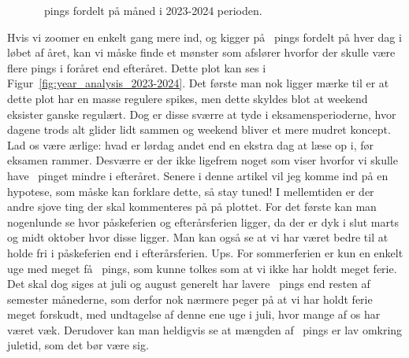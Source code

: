 \begin{article}
\begin{figure}[H]
	\centering
	\resizebox{\columnwidth}{!}{}
	\vspace{-25pt}
	\caption{\protect\coffee\ pings fordelt på måned i 2023-2024 perioden.}
	\label{fig:month_analysis_2023-2024}
\end{figure}

Hvis vi zoomer en enkelt gang mere ind, og kigger på \coffee\ pings fordelt på hver dag i løbet af året, kan vi måske finde et mønster som afslører hvorfor der skulle være flere pings i foråret end efteråret. Dette plot kan ses i Figur~\ref{fig:year_analysis_2023-2024}. Det første man nok ligger mærke til er at dette plot har en masse regulere spikes, men dette skyldes blot at weekend eksister ganske regulært.
Dog er disse sværre at tyde i eksamensperioderne, hvor dagene trods alt glider lidt sammen og weekend bliver et mere mudret koncept. Lad os være ærlige: hvad er lørdag andet end en ekstra dag at læse op i, før eksamen rammer.
Desværre er der ikke ligefrem noget som viser hvorfor vi skulle have \coffee\ pinget mindre i efteråret. Senere i denne artikel vil jeg komme ind på en hypotese, som måske kan forklare dette, så stay tuned! I mellemtiden er der andre sjove ting der skal kommenteres på på plottet.
For det første kan man nogenlunde se hvor påskeferien og efterårsferien ligger, da der er dyk i slut marts og midt oktober hvor disse ligger. Man kan også se at vi har været bedre til at holde fri i påskeferien end i efterårsferien. Ups.
For sommerferien er kun en enkelt uge med meget få \coffee\ pings, som kunne tolkes som at vi ikke har holdt meget ferie. Det skal dog siges at juli og august generelt har lavere \coffee\ pings end resten af semester månederne, som derfor nok nærmere peger på at vi har holdt ferie meget forskudt, med undtagelse af denne ene uge i juli, hvor mange af os har været væk.
Derudover kan man heldigvis se at mængden af \coffee\ pings er lav omkring juletid, som det bør være sig.

\begin{figure*}[t!]
	\centering
	\resizebox{2\columnwidth}{!}{}
	\vspace{-20pt}
	\caption{\protect\coffee\ pings fordelt på årets dag og måned i 2023-2024 perioden.}
	\label{fig:year_analysis_2023-2024}
\end{figure*}


\end{article}
